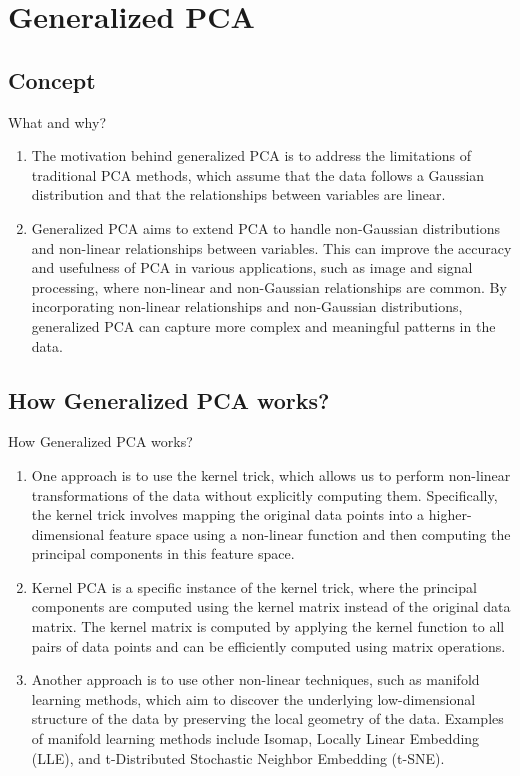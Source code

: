 \documentclass{beamer}
\begin{document}
\section{Generalized PCA}
\subsection{Concept}
\begin{frame}{What and why?}
    \begin{enumerate}
        \item The motivation behind generalized PCA is to address the limitations of traditional PCA methods, which assume that the data follows a Gaussian distribution and that the relationships between variables are linear.
        \item Generalized PCA aims to extend PCA to handle non-Gaussian distributions and non-linear relationships between variables. This can improve the accuracy and usefulness of PCA in various applications, such as image and signal processing, where non-linear and non-Gaussian relationships are common. By incorporating non-linear relationships and non-Gaussian distributions, generalized PCA can capture more complex and meaningful patterns in the data.
    \end{enumerate}
\end{frame}

\subsection{How Generalized PCA works?}
\begin{frame}{How Generalized PCA works?}
    \begin{enumerate}
        \item One approach is to use the kernel trick, which allows us to perform non-linear transformations of the data without explicitly computing them. Specifically, the kernel trick involves mapping the original data points into a higher-dimensional feature space using a non-linear function and then computing the principal components in this feature space.
        \item Kernel PCA is a specific instance of the kernel trick, where the principal components are computed using the kernel matrix instead of the original data matrix. The kernel matrix is computed by applying the kernel function to all pairs of data points and can be efficiently computed using matrix operations.
        \item Another approach is to use other non-linear techniques, such as manifold learning methods, which aim to discover the underlying low-dimensional structure of the data by preserving the local geometry of the data. Examples of manifold learning methods include Isomap, Locally Linear Embedding (LLE), and t-Distributed Stochastic Neighbor Embedding (t-SNE).
    \end{enumerate}
\end{frame}
\end{document}
